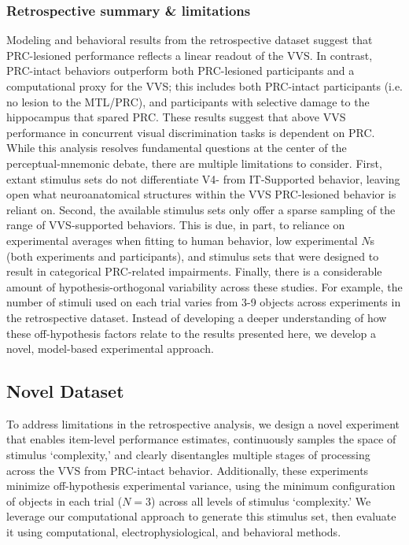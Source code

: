 \documentclass[11pt]{article}
\begin{document}
\subsubsection{Retrospective summary \& limitations}

Modeling and behavioral results from the retrospective dataset suggest that PRC-lesioned performance reflects a linear readout of the VVS. In contrast, PRC-intact behaviors outperform both PRC-lesioned participants and a computational proxy for the VVS; this includes both PRC-intact participants (i.e. no lesion to the MTL/PRC), and participants with selective damage to the hippocampus that spared PRC. These results suggest that above VVS performance in concurrent visual discrimination tasks is dependent on PRC. While this analysis resolves fundamental questions at the center of the perceptual-mnemonic debate, there are multiple limitations to consider. First, extant stimulus sets do not differentiate V4- from IT-Supported behavior, leaving open what neuroanatomical structures within the VVS PRC-lesioned behavior is reliant on. Second, the available stimulus sets only offer a sparse sampling of the range of VVS-supported behaviors. This is due, in part, to reliance on experimental averages when fitting to human behavior, low experimental $N$s (both experiments and participants), and stimulus sets that were designed to result in categorical PRC-related impairments. Finally, there is a considerable amount of hypothesis-orthogonal variability across these studies. For example, the number of stimuli used on each trial varies from 3-9 objects across experiments in the retrospective dataset. Instead of developing a deeper understanding of how these off-hypothesis factors relate to the results presented here, we develop a novel, model-based experimental approach. 

\subsection{Novel Dataset}

To address limitations in the retrospective analysis, we design a novel experiment that enables item-level performance estimates, continuously samples the space of stimulus `complexity,' and clearly disentangles multiple stages of processing across the VVS from PRC-intact behavior. Additionally, these experiments minimize off-hypothesis experimental variance, using the minimum configuration of objects in each trial ($N=3$) across all levels of stimulus `complexity.' We leverage our computational approach to generate this stimulus set, then evaluate it using computational, electrophysiological, and behavioral methods. 
\end{document}
